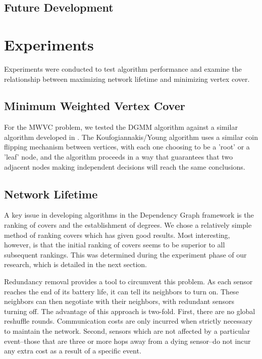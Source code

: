 \documentclass[technote, 10pt, letter]{IEEEtran}
\begin{document}
\subsection{Future Development}
\label{sec:sim-future}

\section{Experiments}
\label{sec:experiments}
Experiments were conducted to test algorithm performance and examine the relationship between maximizing network lifetime and minimizing vertex cover.
\subsection{Minimum Weighted Vertex Cover}
\label{sub:mwvc-exp}

For the MWVC problem, we tested the DGMM algorithm against a similar algorithm developed in \cite{1582746}. The Koufogiannakis/Young algorithm uses a similar coin flipping mechanism between vertices, with each one choosing to be a 'root' or a 'leaf' node, and the algorithm proceeds in a way that guarantees that two adjacent nodes making independent decisions will reach the same conclusions. 

\subsection{Network Lifetime}

A key issue in developing algorithms in the Dependency Graph framework is the ranking of covers and the establishment of degrees. We chose a relatively simple method of ranking covers which has given good results. Most interesting, however, is that the initial ranking of covers seems to be superior to all subsequent rankings. This was determined during the experiment phase of our research, which is detailed in the next section.

Redundancy removal provides a tool to circumvent this problem. As each sensor reaches the end of its battery life, it can tell its neighbors to turn on. These neighbors can then negotiate with their neighbors, with redundant sensors turning off. The advantage of this approach is two-fold. First, there are no global reshuffle rounds. Communication costs are only incurred when strictly necessary to maintain the network. Second, sensors which are not affected by a particular event--those that are three or more hops away from a dying sensor--do not incur any extra cost as a result of a specific event.
\end{document}
